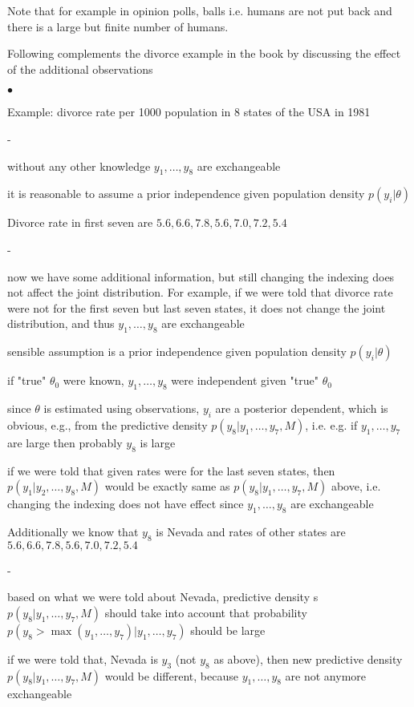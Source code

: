 \documentclass[a4paper,11pt,english]{article}
\begin{document}
Note that for example in opinion polls, balls i.e. humans are not
put back and there is a large but finite number of humans.

\pagebreak
Following complements the divorce example in the book by discussing
the effect of the additional observations
\begin{list}{$\bullet$}{\itemsep=0pt\parsep=4pt\topsep=4pt}
\item Example: divorce rate per 1000 population in 8 states of the
  USA in 1981
  \begin{list}{-}{\itemsep=0pt\parsep=0pt\topsep=0pt}
  \item without any other knowledge $y_1,\ldots,y_8$ are exchangeable
  \item it is reasonable to assume a prior independence given
    population density $p(y_i|\theta)$
  \end{list}
\item Divorce rate in first seven are $5.6, 6.6, 7.8, 5.6,
  7.0, 7.2, 5.4$
  \begin{list}{-}{\itemsep=0pt\parsep=0pt\topsep=0pt}
  \item now we have some additional information, but
    still changing the indexing does not affect the joint
    distribution. For example, if we were told that divorce rate
    were not for the first seven but last seven states, it does not
    change the joint distribution, and thus 
    $y_1,\ldots,y_8$ are exchangeable
  \item sensible assumption is a prior independence given
    population density $p(y_i|\theta)$
  \item if "true" $\theta_0$ were known, $y_1,\ldots,y_8$
    were independent given "true" $\theta_0$ 
  \item since $\theta$ is estimated using observations,  $y_i$ are a
    posterior dependent, which is obvious, e.g., from the
    predictive density $p(y_8|y_1,\ldots,y_7,M)$, i.e. e.g.
    if $y_1,\ldots,y_7$ are large then probably $y_8$ is large
  \item if we were told that given rates were for the last seven
    states, then $p(y_1|y_2,\ldots,y_8,M)$ would be exactly same
    as $p(y_8|y_1,\ldots,y_7,M)$ above, i.e.
    changing the indexing does not have effect since $y_1,\ldots,y_8$
    are exchangeable
  \end{list}
\item Additionally we know that $y_8$ is Nevada and rates of other
  states are $5.6, 6.6, 7.8, 5.6, 7.0, 7.2, 5.4$
  \begin{list}{-}{\itemsep=0pt\parsep=0pt\topsep=0pt}
  \item based on what we were told about Nevada, predictive density s $p(y_8|y_1,\ldots,y_7,M)$
    should take into account that probability
    $p(y_8>\max(y_1,\ldots,y_7)|y_1,\ldots,y_7)$ should be large
  \item if we were told that, Nevada is $y_3$ (not $y_8$ as
    above), then new predictive density
    $p(y_8|y_1,\ldots,y_7,M)$ would be different, because
    $y_1,\ldots,y_8$ are not anymore exchangeable
  \end{list}
\end{list}
  
\end{document}
